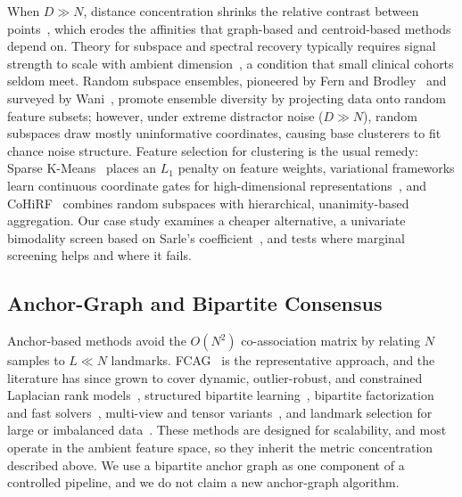 \documentclass[pdflatex,sn-mathphys-num]{sn-jnl}
\theoremstyle{thmstyleone}
\theoremstyle{thmstyletwo}
\theoremstyle{thmstylethree}
\begin{document}
When $D \gg N$, distance concentration shrinks the relative contrast between points~\cite{beyer1999nearest,peng2024interpreting}, which erodes the affinities that graph-based and centroid-based methods depend on. Theory for subspace and spectral recovery typically requires signal strength to scale with ambient dimension~\cite{zhang2024optimal}, a condition that small clinical cohorts seldom meet. Random subspace ensembles, pioneered by Fern and Brodley~\cite{fern2003random} and surveyed by Wani~\cite{wani2024comprehensive}, promote ensemble diversity by projecting data onto random feature subsets; however, under extreme distractor noise ($D \gg N$), random subspaces draw mostly uninformative coordinates, causing base clusterers to fit chance noise structure. Feature selection for clustering is the usual remedy: Sparse K-Means~\cite{witten2010framework} places an $L_1$ penalty on feature weights, variational frameworks learn continuous coordinate gates for high-dimensional representations~\cite{chen2026data}, and CoHiRF~\cite{belucci2025cohirf} combines random subspaces with hierarchical, unanimity-based aggregation. Our case study examines a cheaper alternative, a univariate bimodality screen based on Sarle's coefficient~\cite{sas1990stat}, and tests where marginal screening helps and where it fails.

\subsection{Anchor-Graph and Bipartite Consensus}\label{sec:rel_anchor}

Anchor-based methods avoid the $O(N^2)$ co-association matrix by relating $N$ samples to $L \ll N$ landmarks. FCAG~\cite{nie2024fast} is the representative approach, and the literature has since grown to cover dynamic, outlier-robust, and constrained Laplacian rank models~\cite{xu2026range,ma2025large,gao2026consistency}, structured bipartite learning~\cite{zhang2025structured,wang2024structured}, bipartite factorization and fast solvers~\cite{tkde2026fast,ma2025fast,zhang2025anchor,xie2025fast}, multi-view and tensor variants~\cite{fettal2026scalable,ren2026multiview,song2026enhanced,ou2024anchor,zhao2024multiview,fan2026robust}, and landmark selection for large or imbalanced data~\cite{guo2026consensus,kong2026adaptive,li2026rfag,chakraborty2026generic}. These methods are designed for scalability, and most operate in the ambient feature space, so they inherit the metric concentration described above. We use a bipartite anchor graph as one component of a controlled pipeline, and we do not claim a new anchor-graph algorithm.
\end{document}
